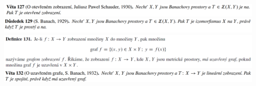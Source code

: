 \documentclass[12pt,a4paper]{article}
\begin{document}
\begin{center}
		\includegraphics[width=\textwidth]{img/2banHilb/2020-06-20 17 30 19.png}\vspace{0.3cm}
		\includegraphics[width=\textwidth]{img/2banHilb/2020-06-20 17 30 34.png}\vspace{0.3cm}
		\includegraphics[width=\textwidth]{img/2banHilb/2020-06-21 17 27 05.png}\vspace{0.3cm}
		\includegraphics[width=\textwidth]{img/2banHilb/2020-06-20 17 30 49.png}\vspace{0.3cm}
	\end{center}
\end{document}
